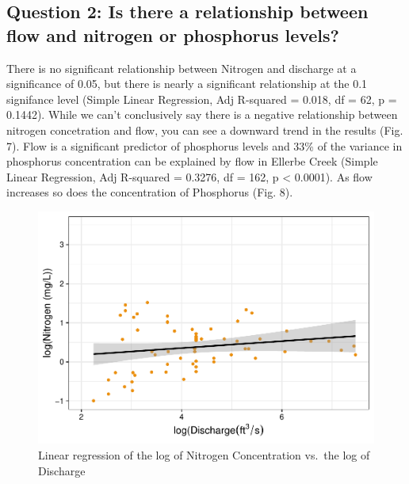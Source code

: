\documentclass[12pt,]{article}
\begin{document}
\newpage

\hypertarget{question-2-is-there-a-relationship-between-flow-and-nitrogen-or-phosphorus-levels}{%
\subsection{Question 2: Is there a relationship between flow and
nitrogen or phosphorus
levels?}\label{question-2-is-there-a-relationship-between-flow-and-nitrogen-or-phosphorus-levels}}

There is no significant relationship between Nitrogen and discharge at a
significance of 0.05, but there is nearly a significant relationship at
the 0.1 signifance level (Simple Linear Regression, Adj R-squared =
0.018, df = 62, p = 0.1442). While we can't conclusively say there is a
negative relationship between nitrogen concetration and flow, you can
see a downward trend in the results (Fig. 7). Flow is a significant
predictor of phosphorus levels and 33\% of the variance in phosphorus
concentration can be explained by flow in Ellerbe Creek (Simple Linear
Regression, Adj R-squared = 0.3276, df = 162, p \textless{} 0.0001). As
flow increases so does the concentration of Phosphorus (Fig. 8).

\begin{figure}
\centering
\includegraphics{Landman_ENV872_Project_files/figure-latex/Data Analysis Figure 7-1.pdf}
\caption{Linear regression of the log of Nitrogen Concentration vs.~the
log of Discharge}
\end{figure}
\end{document}
